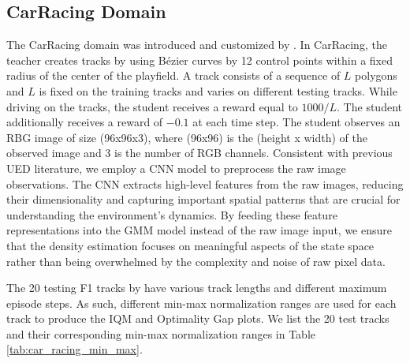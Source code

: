 \subsection{CarRacing Domain}
The CarRacing domain was introduced and customized by \cite{jiang2021replay}. In CarRacing, the teacher creates tracks by using Bézier curves by 12 control points within a fixed radius of the center of the playfield. A track consists of a sequence of $L$ polygons and $L$ is fixed on the training tracks and varies on different testing tracks. While driving on the tracks, the student receives a reward equal to $1000/L$. The student additionally receives a reward of $-0.1$ at each time step. The student observes an RBG image of size (96x96x3), where (96x96) is the (height x width) of the observed image and 3 is the number of RGB channels. Consistent with previous UED literature, we employ a CNN model to preprocess the raw image observations. The CNN extracts high-level features from the raw images, reducing their dimensionality and capturing important spatial patterns that are crucial for understanding the environment's dynamics. By feeding these feature representations into the GMM model instead of the raw image input, we ensure that the density estimation focuses on meaningful aspects of the state space rather than being overwhelmed by the complexity and noise of raw pixel data. 

The 20 testing F1 tracks by \cite{jiang2021replay} have various track lengths and different maximum episode steps. As such, different min-max normalization ranges are used for each track to produce the IQM and Optimality Gap plots. We list the 20 test tracks and their corresponding min-max normalization ranges in Table \ref{tab:car_racing_min_max}.

